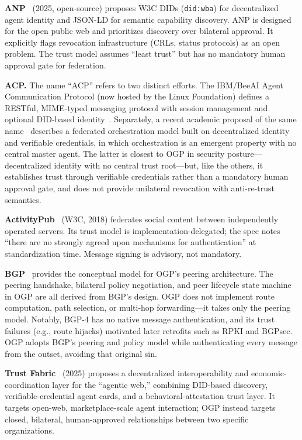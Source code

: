\documentclass[sigconf,nonacm]{acmart}
\begin{document}
\textbf{ANP}~\cite{anp2024} (2025, open-source) proposes W3C DIDs
(\texttt{did:wba}) for decentralized agent identity and JSON-LD for
semantic capability discovery. ANP is designed for the open public web
and prioritizes discovery over bilateral approval. It explicitly flags
revocation infrastructure (CRLs, status protocols) as an open problem.
The trust model assumes ``least trust'' but has no mandatory human
approval gate for federation.

\textbf{ACP.} The name ``ACP'' refers to two distinct efforts. The
IBM/BeeAI Agent Communication Protocol (now hosted by the Linux Foundation)
defines a RESTful, MIME-typed messaging protocol with session management
and optional DID-based identity~\cite{survey2025}. Separately, a recent
academic proposal of the same name~\cite{acp2026} describes a federated
orchestration model built on decentralized identity and verifiable
credentials, in which orchestration is an emergent property with no central
master agent. The latter is closest to OGP in security posture---decentralized
identity with no central trust root---but, like the others, it establishes
trust through verifiable credentials rather than a mandatory human approval
gate, and does not provide unilateral revocation with anti-re-trust semantics.

\textbf{ActivityPub}~\cite{activitypub2018} (W3C, 2018) federates
social content between independently operated servers.
Its trust model is implementation-delegated; the spec notes ``there
are no strongly agreed upon mechanisms for authentication'' at
standardization time. Message signing is advisory, not mandatory.

\textbf{BGP}~\cite{rfc4271} provides the conceptual model for OGP's
peering architecture. The peering handshake, bilateral policy
negotiation, and peer lifecycle state machine in OGP are all derived
from BGP's design. OGP does not implement route computation, path
selection, or multi-hop forwarding---it takes only the peering model.
Notably, BGP-4 has no native message authentication, and its trust
failures (e.g., route hijacks) motivated later retrofits such as RPKI and
BGPsec. OGP adopts BGP's peering and policy model while authenticating
every message from the outset, avoiding that original sin.

\textbf{Trust Fabric}~\cite{trustfabric2025} (2025) proposes a decentralized
interoperability and economic-coordination layer for the ``agentic web,''
combining DID-based discovery, verifiable-credential agent cards, and a
behavioral-attestation trust layer. It targets open-web, marketplace-scale
agent interaction; OGP instead targets closed, bilateral, human-approved
relationships between two specific organizations.
\end{document}
